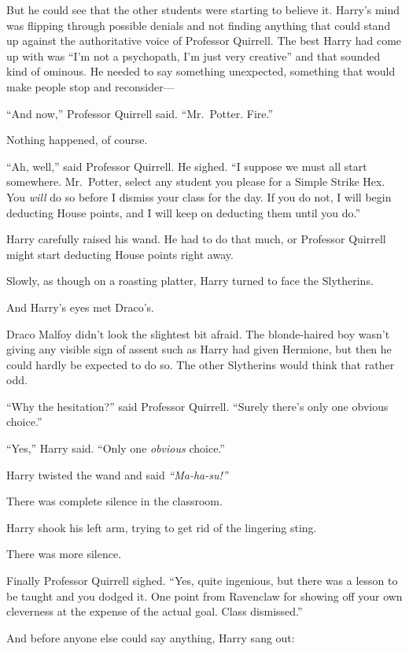 But he could see that the other students were starting to believe it.
Harry's mind was flipping through possible denials and not finding
anything that could stand up against the authoritative voice of
Professor Quirrell. The best Harry had come up with was ``I'm not a
psychopath, I'm just very creative'' and that sounded kind of ominous.
He needed to say something unexpected, something that would make people
stop and reconsider---

``And now,'' Professor Quirrell said. ``Mr.~Potter. Fire.''

Nothing happened, of course.

``Ah, well,'' said Professor Quirrell. He sighed. ``I suppose we must
all start somewhere. Mr.~Potter, select any student you please for a
Simple Strike Hex. You \emph{will} do so before I dismiss your class for
the day. If you do not, I will begin deducting House points, and I will
keep on deducting them until you do.''

Harry carefully raised his wand. He had to do that much, or Professor
Quirrell might start deducting House points right away.

Slowly, as though on a roasting platter, Harry turned to face the
Slytherins.

And Harry's eyes met Draco's.

Draco Malfoy didn't look the slightest bit afraid. The blonde-haired boy
wasn't giving any visible sign of assent such as Harry had given
Hermione, but then he could hardly be expected to do so. The other
Slytherins would think that rather odd.

``Why the hesitation?'' said Professor Quirrell. ``Surely there's only
one obvious choice.''

``Yes,'' Harry said. ``Only one \emph{obvious} choice.''

Harry twisted the wand and said \emph{``Ma-ha-su!''}

There was complete silence in the classroom.

Harry shook his left arm, trying to get rid of the lingering sting.

There was more silence.

Finally Professor Quirrell sighed. ``Yes, quite ingenious, but there was
a lesson to be taught and you dodged it. One point from Ravenclaw for
showing off your own cleverness at the expense of the actual goal. Class
dismissed.''

And before anyone else could say anything, Harry sang out:

